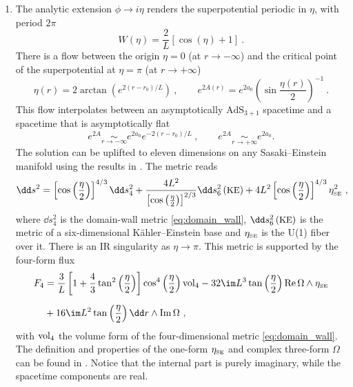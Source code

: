 \begin{enumerate}
\item The analytic extension $\phi\to i\eta$ renders the superpotential periodic in $\eta$, with period $2\pi$
\begin{equation}
	W(\eta)= \frac{2}{L}\left[\cos(\eta)+1\right]\ .
\end{equation}
There is a flow between the origin $\eta=0$ (at $r\to-\infty$) and the critical point of the superpotential at $\eta=\pi$ (at $r\to+\infty$)
\begin{equation}
	\eta(r) = 2\arctan{\left(e^{2 (r-r_0)/L}\right)}
	\ , \qquad
e^{2A(r)}=e^{2a_0} \left( \sin\frac{\eta(r)}{2}\right)^{-1}\ . 
\end{equation}
This flow interpolates between an asymptotically $\text{AdS}_{3+1}$ spacetime and a spacetime that is asymptotically flat
\begin{equation}
	e^{2A} \underset{r\to-\infty}{\sim} e^{2a_0}e^{-2(r-r_0)/L}
	\ ,\qquad 
	e^{2A} \underset{r\to +\infty}{\sim} e^{2a_0}.
\end{equation}
The solution can be uplifted to eleven dimensions on any Sasaki--Einstein manifold using the results in \cite{Gauntlett:2009dn}. The metric reads
\begin{align}
\dd s^2=\left[\cos\left(\frac{\eta}{2}\right)\right]^{4/3}\dd s_4^2+\frac{4L^2}{\left[\cos\left(\frac{\eta}{2}\right)\right]^{2/3}}\dd s_6^2\left(\text{\small KE}\right)+4L^2\left[\cos\left(\frac{\eta}{2}\right)\right]^{4/3}\eta_{\text{\tiny SE}}^2\ ,
\end{align}
where $\dd s_4^2$ is the domain-wall metric  \eqref{eq:domain_wall}, $\dd s_6^2\left(\text{\small KE}\right)$ is the metric of a six-dimensional K\"ahler--Einstein base and $\eta_{\text{\tiny SE}}$ is the U(1) fiber over it. There is an IR singularity as $\eta\to\pi$. This metric is supported by the four-form flux  
\begin{align}
F_4&=\frac{3}{L}\left[1+\frac43\tan^2\left(\frac{\eta}{2}\right)\right]\cos^4\left(\frac{\eta}{2}\right){\rm vol}_4-32\im L^3\tan\left(\frac{\eta}{2}\right){\rm Re}\,\Omega\wedge\eta_{\text{\tiny SE}}\nonumber\\[2mm]
&+16\im L^2\tan\left(\frac{\eta}{2}\right)\dd r\wedge{\rm Im}\,\Omega\ ,
\end{align}
with ${\rm vol}_4$ the volume form of the four-dimensional metric \eqref{eq:domain_wall}. The definition and properties of the one-form $\eta_{\text{\tiny SE}}$ and complex three-form $\Omega$ can be found in \cite{Gauntlett:2009dn}. Notice that the internal part is purely imaginary, while the spacetime components are real. 


\end{enumerate}
